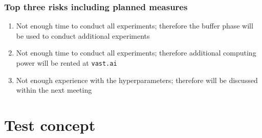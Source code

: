 \subsection{Top three risks including planned measures}
\begin{enumerate}
    \setlength\itemsep{0em}
    \item Not enough time to conduct all experiments; therefore the buffer phase will be used to conduct additional experiments
    \item Not enough time to conduct all experiments; therefore additional computing power will be rented at \texttt{vast.ai}
    \item Not enough experience with the hyperparameters; therefore will be discussed within the next meeting
\end{enumerate}

\chapter{Test concept}
\label{app:Test-Concept}

\clearpage
\landscapevalues


